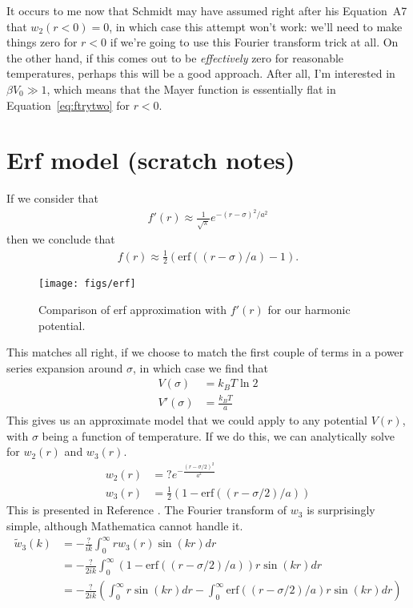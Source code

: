 \documentclass[letterpaper,twocolumn,amsmath,amssymb,prb]{revtex4-1}
\begin{document}
It occurs to me now that Schmidt may have assumed right after his
Equation~A7 that $w_2(r<0)=0$, in which case this attempt won't work:
we'll need to make things zero for $r<0$ if we're going to use this
Fourier transform trick at all.  On the other hand, if this comes out
to be \emph{effectively} zero for reasonable temperatures, perhaps
this will be a good approach.  After all, I'm interested in $\beta V_0
\gg 1$, which means that the Mayer function is essentially flat in
Equation~\ref{eq:ftrytwo} for $r<0$.

\section{Erf model (scratch notes)}
If we consider that
\begin{align}
  f'(r) \approx \frac{1}{\sqrt{\pi}} e^{-(r-\sigma)^2/a^2}
\end{align}
then we conclude that
\begin{align}
  f(r) \approx \tfrac12 ( \mathrm{erf}((r-\sigma)/a) - 1 ).
\end{align}
\begin{figure}
  \texttt{[image: figs/erf]}
  \caption{Comparison of erf approximation with $f'(r)$ for our
    harmonic potential.}
\end{figure}
This matches all right, if we choose to match the first couple of
terms in a power series expansion around $\sigma$, in which case we
find that
\begin{align}
  V(\sigma) &= k_BT \ln 2 \\
  V'(\sigma) &= \frac{k_BT}{a}
\end{align}
This gives us an approximate model that we could apply to any
potential $V(r)$, with $\sigma$ being a function of temperature.  If
we do this, we can analytically solve for $w_2(r)$ and $w_3(r)$.
\begin{align}
  w_2(r) &= ? e^{-\frac{(r-\sigma/2)^2}{a^2}} \\
  w_3(r) &= \tfrac12 ( 1 - \mathrm{erf}((r-\sigma/2)/a) )
\end{align}
This is presented in Reference .  The
Fourier transform of $w_3$ is surprisingly simple, although
Mathematica cannot handle it.
\begin{align}
  \tilde{w}_3(k) &= -\frac{?}{ik} \int_0^\infty r w_3(r) \sin(kr) dr
  \\
  &=  -\frac{?}{2ik} \int_0^\infty ( 1 -
  \mathrm{erf}((r-\sigma/2)/a) ) r \sin(kr) dr
  \\
  &=  -\frac{?}{2ik} \left(
  \int_0^\infty r \sin(kr) dr
  -
  \int_0^\infty \mathrm{erf}((r-\sigma/2)/a) r \sin(kr) dr
  \right)
\end{align}
\end{document}
